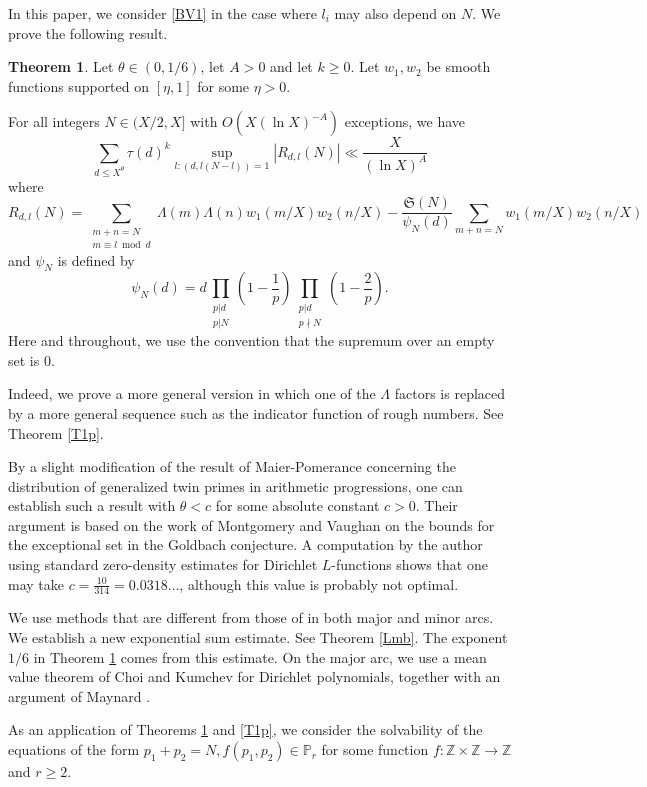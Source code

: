 \documentclass{amsart}
\theoremstyle{definition}
\newtheorem{thm}[dfn]{Theorem}
\theoremstyle{remark}
\newcommand{\1}{
    \bm{1}
}
\begin{document}
In this paper, we consider \eqref{BV1} in the case where $l_i$ may also depend on $N$. 
We prove the following result. 
\begin{thm}\label{T1}
Let $\theta \in (0,1/6)$, let $A>0$ and let $k \geq 0$. 
Let $w_1,w_2$ be smooth functions supported on $[\eta,1]$ for some $\eta>0$. 

For all integers $N \in (X/2,X]$ with $O(X(\ln{X})^{-A})$ exceptions, we have
\[ \sum_{d \leq X^{\theta}} \tau(d)^k \sup_{l:(d,l(N-l))=1} |R_{d,l}(N)| \ll \frac{X}{(\ln{X})^A} \]
where
\[ R_{d,l}(N) = \sum_{\substack{m+n=N \\ m \equiv l \bmod d}} \Lambda(m) \Lambda(n) w_1(m/X) w_2(n/X) - \frac{\mathfrak{S}(N)}{\psi_N(d)} \sum_{m+n=N} w_1(m/X) w_2(n/X) \]
and $\psi_N$ is defined by
\[ \psi_N(d) = d \prod_{\substack{p|d \\ p | N}} \left( 1 - \frac{1}{p} \right) \prod_{\substack{p|d \\ p \nmid N}} \left( 1 - \frac{2}{p} \right). \]
Here and throughout, we use the convention that the supremum over an empty set is $0$. 
\end{thm}

Indeed, we prove a more general version in which one of the $\Lambda$ factors is replaced by a more general sequence such as the indicator function of rough numbers. See Theorem \ref{T1p}. 


By a slight modification of the result of Maier-Pomerance \cite[Theorem 3.1]{maier1990unusually} concerning the distribution of generalized twin primes in arithmetic progressions, one can establish such a result with $\theta < c$ for some absolute constant $c>0$. Their argument is based on the work of Montgomery and Vaughan \cite{montgomery1975exceptional} on the bounds for the exceptional set in the Goldbach conjecture. 
A computation by the author using standard zero-density estimates for Dirichlet $L$-functions shows that one may take $c = \frac{10}{314} = 0.0318\ldots$, although this value is probably not optimal. 


We use methods that are different from those of \cite{maier1990unusually} in both major and minor arcs. 
We establish a new exponential sum estimate. See Theorem \ref{Lmb}. The exponent $1/6$ in Theorem \ref{T1} comes from this estimate. 
On the major arc, we use a mean value theorem of Choi and Kumchev \cite{choi2006mean} for Dirichlet polynomials, together with an argument of Maynard \cite{maynard2024note}. 


As an application of Theorems \ref{T1} and \ref{T1p}, we consider the solvability of the equations of the form $p_1+p_2=N, f(p_1,p_2) \in \mathbb{P}_{r}$ for some function $f:\mathbb{Z} \times \mathbb{Z} \to \mathbb{Z}$ and $r \geq 2$. 
\end{document}
